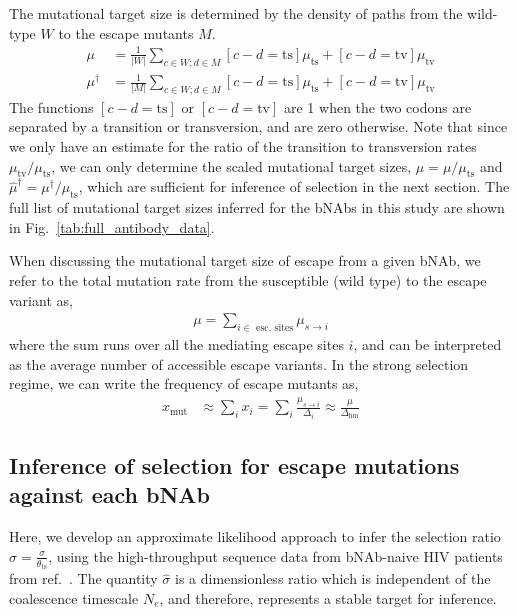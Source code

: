 \documentclass[11pt]{article}
\newcommand{\ts}{{\text{ts}}}
\newcommand{\tv}{{\text{tv}}}
\begin{document}
The mutational target size is determined by the density of paths from the wild-type $W$ to the escape mutants $M$. 
\begin{align}
\mu &= \frac{1}{|W|} \sum_{c\in W ; d \in M}  [c-d = \text{ts}] \mu_{\ts} + [c-d = \text{tv}]  \mu_{\tv} \\
\mu^\dagger &= \frac{1}{|M|} \sum_{c \in W ; d \in M}[c-d = \text{ts}] \mu_{\ts}+  [c-d = \text{tv}] \mu_{\tv} 
\end{align}
The functions $[c-d = \text{ts}]$ or $[c-d = \text{tv}]$ are 1 when the two codons are separated by a transition or transversion, and are zero otherwise.  Note that since we only have an estimate for the ratio of the transition to transversion rates $\mu_{\tv}/\mu_{\ts}$,
	 we can only determine the scaled mutational target sizes, $\hat{\mu}  = \mu/\mu_{\ts}$ and $\hat{\mu}^\dagger =  \mu^\dagger/\mu_{\ts}$, which are sufficient for inference of selection in the next section. The full list of mutational target sizes inferred for the  bNAbs in this study are  shown in Fig.~\ref{tab:full_antibody_data}.

When discussing the mutational target size of escape from a given bNAb, we refer to the total mutation rate from the susceptible (wild type) to the escape variant as,
\begin{align}
\mu = \sum_{i\in \text{ esc. sites} }\mu_{s\to i}
\end{align}
where the sum runs over all the mediating escape sites $i$, and  can be interpreted as the average number of accessible escape variants. In the strong selection regime, we can write the frequency of escape mutants as,
\begin{align}
x_\text{mut} &\approx \sum_i x_i = \sum_i \frac{\mu_{s\to i}}{\Delta_i} \approx  \frac{\mu}{\Delta_\text{hm}} 
\end{align}

\subsection{Inference of selection for escape mutations against each bNAb}

Here, we  develop an approximate likelihood approach to infer  the selection ratio $\hat{\sigma} = \frac{\sigma}{\theta_{\ts}}$, using the high-throughput sequence data from bNAb-naive HIV patients from ref.~\cite{Zanini:2017in}. The quantity $\hat{\sigma}$ is a dimensionless ratio which is independent of the coalescence timescale $N_e$, and therefore, represents a stable target for inference.
\end{document}
